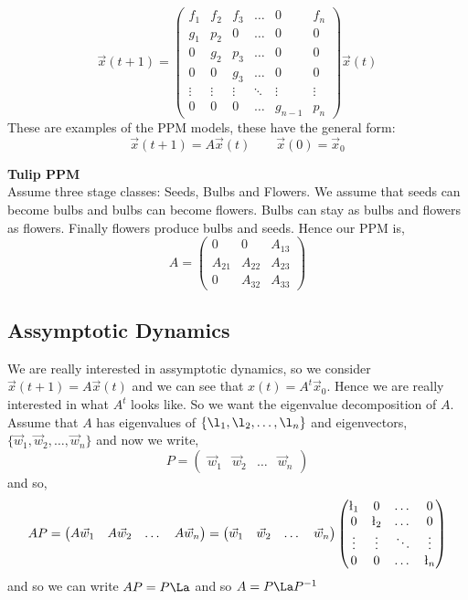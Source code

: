 $$ \vec x(t+1) = \begin{pmatrix}
  f_1 & f_2 & f_3 & \dots & 0 & f_n \\
  g_1 & p_2 & 0 & \dots & 0 & 0 \\
  0 & g_2 & p_3 & \dots  & 0 & 0 \\
  0 & 0 & g_3 & \dots  & 0 & 0 \\
  \vdots & \vdots & \vdots & \ddots & \vdots & \vdots \\
  0 & 0 & 0 & \dots & g_{n-1} & p_n
\end{pmatrix} \vec x(t)$$
These are examples of the PPM models, these have the general form:
$$ \vec x(t+1) = A\vec x(t) \qquad \vec x(0) = \vec x_0 $$
\begin{eg}
  \textbf{Tulip PPM}\\
  Assume three stage classes: Seeds, Bulbs and Flowers. We assume that seeds can become bulbs and bulbs can become flowers. Bulbs can stay as bulbs and flowers as flowers. Finally flowers produce bulbs and seeds. Hence our PPM is,
  $$ A = \begin{pmatrix}
    0 & 0 & A_{13} \\
    A_{21} & A_{22} & A_{23} \\
    0 & A_{32} & A_{33}
  \end{pmatrix} $$
\end{eg}

\subsection{Assymptotic Dynamics}
We are really interested in assymptotic dynamics, so we consider $\vec x(t+1) = A\vec x(t)$ and we can see that $x(t) = A^t\vec x_0$. Hence we are really interested in what $A^t$ looks like. So we want the eigenvalue decomposition of $A$. Assume that $A$ has eigenvalues of $\{\l_1, \l_2, \dots, \l_n\}$ and eigenvectors, $\{\vec w_1, \vec w_2, \dots, \vec w_n\}$ and now we write,
$$ P = \begin{pmatrix}
  \vec w_1 & \vec w_2 & \dots & \vec w_n
\end{pmatrix} $$
and so,
$$ AP = \begin{pmatrix}
  A\vec w_1 & A\vec w_2 & \dots & A\vec w_n
\end{pmatrix} = \begin{pmatrix}
  \vec w_1 & \vec w_2 & \dots & \vec w_n
\end{pmatrix}\begin{pmatrix}
  \l_1 & 0 & \dots & 0\\
  0 & \l_2 & \dots & 0 \\
  \vdots & \vdots & \ddots & \vdots \\
  0 & 0 & \dots & \l_n
\end{pmatrix} $$
and so we can write $AP = P\La$ and so $A = P\La P^{-1}$